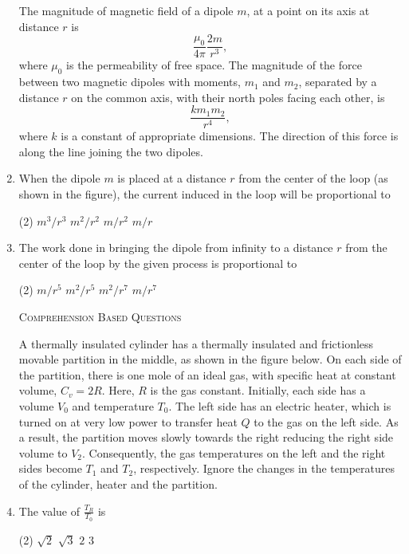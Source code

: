 \documentclass{article}
\begin{document}
\begin{enumerate}
    The magnitude of magnetic field of a dipole $m$, at a point on its axis at distance $r$ is $$\frac{\mu_0}{4\pi}\frac{2m}{r^3},$$ where $\mu_0$ is the permeability of free space. The magnitude of the force between two magnetic dipoles with moments, $m_1$ and $m_2$, separated by a distance $r$ on the common axis, with their north poles facing each other, is $$\frac{k m_1 m_2}{r^4},$$ where $k$ is a constant of appropriate dimensions. The direction of this force is along the line joining the two dipoles.
    \begin{center}
    \end{center}

    \item  When the dipole $m$ is placed at a distance $r$ from the center of the loop (as shown in the figure), the current induced in the loop will be 
    proportional to 
    \begin{tasks}(2)
        \task $m^3/r^3$ 
        \task $m^2/r^2$ 
        \task $m/r^2$ 
        \task $m/r$
    \end{tasks}
    \item The work done in bringing the dipole from infinity to a distance $r$ from the center of the loop by the given process is proportional to 
    \begin{tasks}(2)
        \task $m/r^5$ 
        \task $m^2/r^5$ 
        \task $m^2/r^7$ 
        \task $m/r^7$
    \end{tasks}



\begin{center}
    \textsc{Comprehension Based Questions}
\end{center}
    A thermally insulated cylinder has a thermally insulated and frictionless movable partition in the middle, as shown in the figure below. On each side of the partition, there is one mole of an ideal gas, with specific heat at constant volume, $C_v=2R$. Here, $R$ is the gas constant. Initially, each side has a volume $V_0$ and temperature $T_0$. The left side has an electric heater, which is turned on at very low power to transfer heat $Q$ to the gas on the left side. As a result, the partition moves slowly towards the right reducing the right side volume to $V_2$. Consequently, the gas temperatures on the left and the right sides become $T_1$ and $T_2$, respectively. Ignore the changes in the temperatures of the cylinder, heater and the partition.
    \begin{center}
    \end{center}
    \item The value of $\frac{T_R}{T_0}$ is 
    \begin{tasks}(2)
        \task $\sqrt{2}$
        \task $\sqrt{3}$
        \task $2$
        \task $3$
    \end{tasks}



\end{enumerate}
\end{document}
